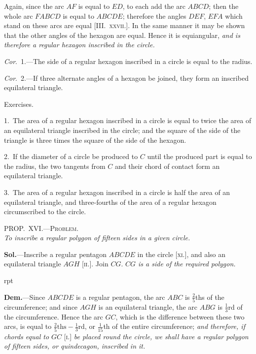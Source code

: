 \documentclass[oneside]{book}
\newcounter{wrapwidth}
\newcommand\myprop[2]{
\bigskip\Needspace*{4\baselineskip}\begin{center}\textsc{#1}\\\medskip\emph{#2}\par\end{center}
}
\newcommand\exhead[1]{
\Needspace*{5\baselineskip}\begin{center}
\textsf{#1}
\end{center}
}
\newcommand\imgflow[3]{
\setcounter{wrapwidth}{#1}

\begin{wrapfigure}[#2]{r}{\value{wrapwidth}pt}
\begin{center}
\vspace{-0.3in}

\end{center}
\end{wrapfigure}
}
\begin{document}
Again, since the arc $AF$ is equal to $ED$, to each add
the arc $ABCD$; then the whole arc $FABCD$ is equal to
$ABCDE$; therefore the angles $DEF$, $EFA$ which stand
on these arcs are equal [\textsc{III\@.~xxvii.}]. In the same
manner it may be shown that the other angles of the
hexagon are equal. Hence it is equiangular, \emph{and is
therefore a regular hexagon inscribed in the circle.}



\emph{Cor}.~1.---The side of a regular hexagon inscribed in
a circle is equal to the radius.

\emph{Cor}.~2.---If three alternate angles of a hexagon be
joined, they form an inscribed equilateral triangle.

\exhead{Exercises.}

\begin{footnotesize}
1.~The area of a regular hexagon inscribed in a circle is equal to
twice the area of an equilateral triangle inscribed in the circle;
and the square of the side of the triangle is three times the square
of the side of the hexagon.

2.~If the diameter of a circle be produced to $C$ until the produced
part is equal to the radius, the two tangents from $C$ and
their chord of contact form an equilateral triangle.

3.~The area of a regular hexagon inscribed in a circle is half
the area of an equilateral triangle, and three-fourths of the area
of a regular hexagon circumscribed to the circle.
\par\end{footnotesize}

\myprop{PROP\@.~XVI\@.---Problem.}{To inscribe a regular polygon of fifteen sides in a given circle.}

\textbf{Sol.}---Inscribe a regular pentagon $ABCDE$ in the
circle [\textsc{xi.}], and also an equilateral triangle $AGH$ [\textsc{ii.}].
Join $CG$. \emph{$CG$ is a side of the required polygon.}


\imgflow{110}{9}{f168}

\textbf{Dem.}---Since $ABCDE$ is a regular pentagon, the arc
$ABC$ is $\frac{2}{5}$ths of the circumference;
and since $AGH$ is an equilateral
triangle, the arc $ABG$ is $\frac{1}{3}$rd of
the circumference. Hence the arc
$GC$, which is the difference between
these two arcs, is equal to
$\frac{2}{5}\text{ths} - \frac{1}{3}$rd, or $\frac{1}{15}$th of the entire
circumference; \emph{and therefore, if
chords equal to $GC$} [\textsc{i.}] \emph{be placed
round the circle, we shall have a
regular polygon of fifteen sides, or quindecagon, inscribed
in it.}\par\smallskip
\end{document}
